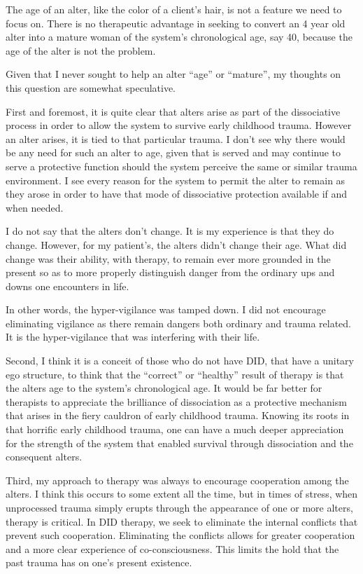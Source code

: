 \documentclass[]{book}
\begin{document}
The age of an alter, like the color of a client's hair, is not a feature we need to focus on. There is no therapeutic advantage in seeking to convert an 4 year old alter into a mature woman of the system's chronological age, say 40, because the age of the alter is not the problem.

Given that I never sought to help an alter ``age'' or ``mature'', my thoughts on this question are somewhat speculative.

First and foremost, it is quite clear that alters arise as part of the dissociative process in order to allow the system to survive early childhood trauma. However an alter arises, it is tied to that particular trauma. I don't see why there would be any need for such an alter to age, given that is served and may continue to serve a protective function should the system perceive the same or similar trauma environment. I see every reason for the system to permit the alter to remain as they arose in order to have that mode of dissociative protection available if and when needed.

I do not say that the alters don't change. It is my experience is that they do change. However, for my patient's, the alters didn't change their age. What did change was their ability, with therapy, to remain ever more grounded in the present so as to more properly distinguish danger from the ordinary ups and downs one encounters in life.

In other words, the hyper-vigilance was tamped down. I did not encourage eliminating vigilance as there remain dangers both ordinary and trauma related. It is the hyper-vigilance that was interfering with their life.

Second, I think it is a conceit of those who do not have DID, that have a unitary ego structure, to think that the ``correct'' or ``healthy'' result of therapy is that the alters age to the system's chronological age. It would be far better for therapists to appreciate the brilliance of dissociation as a protective mechanism that arises in the fiery cauldron of early childhood trauma. Knowing its roots in that horrific early childhood trauma, one can have a much deeper appreciation for the strength of the system that enabled survival through dissociation and the consequent alters.

Third, my approach to therapy was always to encourage cooperation among the alters. I think this occurs to some extent all the time, but in times of stress, when unprocessed trauma simply erupts through the appearance of one or more alters, therapy is critical. In DID therapy, we seek to eliminate the internal conflicts that prevent such cooperation. Eliminating the conflicts allows for greater cooperation and a more clear experience of co-consciousness. This limits the hold that the past trauma has on one's present existence.
\end{document}
